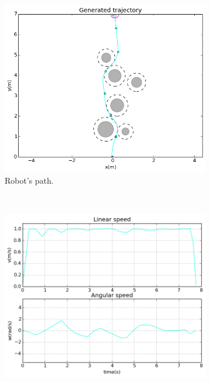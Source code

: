 \begin{figure}[!h]
        \centering
        ~ %
        \begin{subfigure}[b]{0.48\textwidth}
                \includegraphics[width=\textwidth]{./img/realtime/sim_results/p_6_1.28_3.2_12_6_0.001_15_40_20_5.0_0.1_3.0_0.5_1.0_10.0/multirobot-path.png}
                \caption{Robot's path.}\label{fig:rpath}
        \end{subfigure}
        ~ %
        \begin{subfigure}[b]{0.48\textwidth}
		\includegraphics[width=\textwidth]{./img/realtime/sim_results/p_6_1.28_3.2_12_6_0.001_15_40_20_5.0_0.1_3.0_0.5_1.0_10.0/multirobot-vw.png}

\end{subfigure}
\end{figure}
